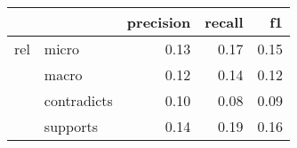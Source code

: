 \begin{tabular}{llrrr}
\toprule
    &          &  precision &  recall &   f1 \\
\midrule
rel & micro &       0.13 &    0.17 & 0.15 \\
    & macro &       0.12 &    0.14 & 0.12 \\
    & contradicts &       0.10 &    0.08 & 0.09 \\
    & supports &       0.14 &    0.19 & 0.16 \\
\bottomrule
\end{tabular}
